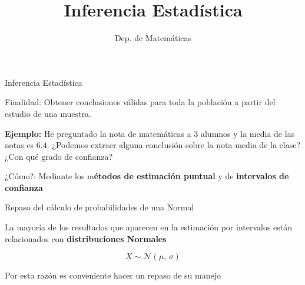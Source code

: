 \documentclass[11pt,handout]{beamer}
\title{Inferencia Estadística}
\date{}
\author{Dep. de Matemáticas}
\begin{document}
\begin{frame}
\titlepage
\end{frame}


\begin{frame}{Inferencia Estadística}
\begin{block}{Finalidad:} Obtener conclusiones válidas para toda la población a partir del estudio de una muestra.
\end{block}

\textbf{Ejemplo:} He preguntado la nota de matemáticas a 3 alumnos y la media de las notas es $6.4$. ¿Podemos extraer alguna conclusión sobre la nota media de la clase?¿Con qué grado de confianza?

\pause

\begin{block}{¿Cómo?:} Mediante los m\textbf{étodos de estimación puntual} y de \textbf{intervalos de confianza}
\end{block}

\end{frame}

\begin{frame}{Repaso del cálculo de probabilidades de una Normal}
\begin{center}
    La mayoría de los resultados que aparecen en la estimación por intervalos están relacionados con \textbf{distribuciones Normales}
    \begin{block}{}
    $$X \sim \mathcal{N}(\mu,\,\sigma)$$
    \end{block}
    Por esta razón es conveniente hacer un repaso de su manejo
\end{center}
\end{frame}
\end{document}
